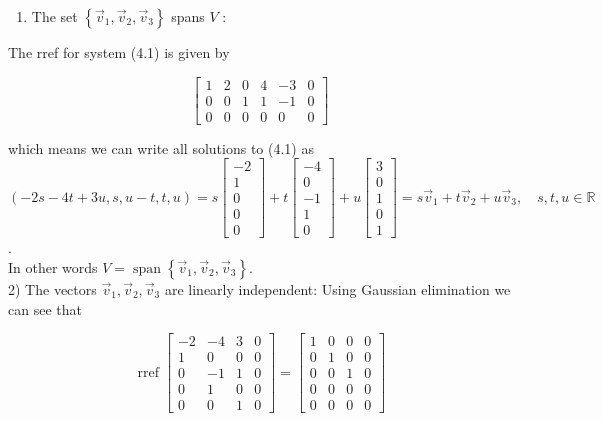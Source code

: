 \documentclass[10pt]{article}
\begin{document}
\begin{enumerate}
  \item The set $\left\{\vec{v}_{1}, \vec{v}_{2}, \vec{v}_{3}\right\}$ spans $V$ :
\end{enumerate}

The rref for system (4.1) is given by

$$
\left[\begin{array}{ccccc|c}
1 & 2 & 0 & 4 & -3 & 0 \\
0 & 0 & 1 & 1 & -1 & 0 \\
0 & 0 & 0 & 0 & 0 & 0
\end{array}\right]
$$

which means we can write all solutions to (4.1) as\\
$(-2 s-4 t+3 u, s, u-t, t, u)=s\left[\begin{array}{c}-2 \\ 1 \\ 0 \\ 0 \\ 0\end{array}\right]+t\left[\begin{array}{c}-4 \\ 0 \\ -1 \\ 1 \\ 0\end{array}\right]+u\left[\begin{array}{l}3 \\ 0 \\ 1 \\ 0 \\ 1\end{array}\right]=s \vec{v}_{1}+t \vec{v}_{2}+u \vec{v}_{3}, \quad s, t, u \in \mathbb{R}$.\\
In other words $V=\operatorname{span}\left\{\vec{v}_{1}, \vec{v}_{2}, \vec{v}_{3}\right\}$.\\
2) The vectors $\vec{v}_{1}, \vec{v}_{2}, \vec{v}_{3}$ are linearly independent: Using Gaussian elimination we can see that

$$
\operatorname{rref}\left[\begin{array}{ccc|c}
-2 & -4 & 3 & 0 \\
1 & 0 & 0 & 0 \\
0 & -1 & 1 & 0 \\
0 & 1 & 0 & 0 \\
0 & 0 & 1 & 0
\end{array}\right]=\left[\begin{array}{lll|l}
1 & 0 & 0 & 0 \\
0 & 1 & 0 & 0 \\
0 & 0 & 1 & 0 \\
0 & 0 & 0 & 0 \\
0 & 0 & 0 & 0
\end{array}\right]
$$
\end{document}
